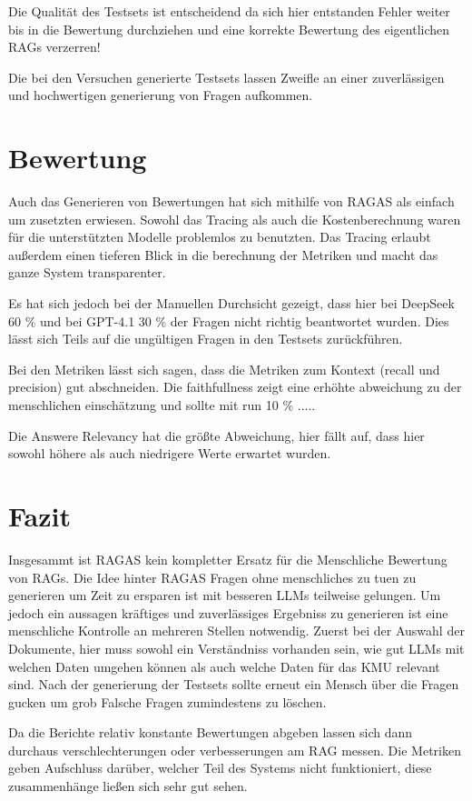 Die Qualität des Testsets ist entscheidend da sich hier entstanden Fehler weiter bis in die Bewertung durchziehen und eine korrekte Bewertung des eigentlichen RAGs verzerren!

Die bei den Versuchen generierte Testsets lassen Zweifle an einer zuverlässigen und hochwertigen generierung von Fragen aufkommen.

\section{Bewertung}

Auch das Generieren von Bewertungen hat sich mithilfe von RAGAS als einfach um zusetzten erwiesen.
Sowohl das Tracing als auch die Kostenberechnung waren für die unterstützten Modelle problemlos zu benutzten.
Das Tracing erlaubt außerdem einen tieferen Blick in die berechnung der Metriken und macht das ganze System transparenter.

Es hat sich jedoch bei der Manuellen Durchsicht gezeigt, dass hier bei DeepSeek 60 \% und bei GPT-4.1 30 \% der Fragen nicht richtig beantwortet wurden.
Dies lässt sich Teils auf die ungültigen Fragen in den Testsets zurückführen.

Bei den Metriken lässt sich sagen, dass die Metriken zum Kontext (recall und precision) gut abschneiden.
Die faithfullness zeigt eine erhöhte abweichung zu der menschlichen einschätzung und sollte mit run 10 \% .....

Die Answere Relevancy hat die größte Abweichung, hier fällt auf, dass hier sowohl höhere als auch niedrigere Werte erwartet wurden.

\section{Fazit}
Insgesammt ist RAGAS kein kompletter Ersatz für die Menschliche Bewertung von RAGs. Die Idee hinter RAGAS Fragen ohne menschliches zu tuen zu generieren um Zeit zu ersparen ist mit besseren LLMs teilweise gelungen.
Um jedoch ein aussagen kräftiges und zuverlässiges Ergebniss zu generieren ist eine menschliche Kontrolle an mehreren Stellen notwendig.
Zuerst bei der Auswahl der Dokumente, hier muss sowohl ein Verständniss vorhanden sein, wie gut LLMs mit welchen Daten umgehen können als auch welche Daten für das KMU relevant sind.
Nach der generierung der Testsets sollte erneut ein Mensch über die Fragen gucken um grob Falsche Fragen zumindestens zu löschen.

Da die Berichte relativ konstante Bewertungen abgeben lassen sich dann durchaus verschlechterungen oder verbesserungen am RAG messen.
Die Metriken geben Aufschluss darüber, welcher Teil des Systems nicht funktioniert, diese zusammenhänge ließen sich sehr gut sehen.

